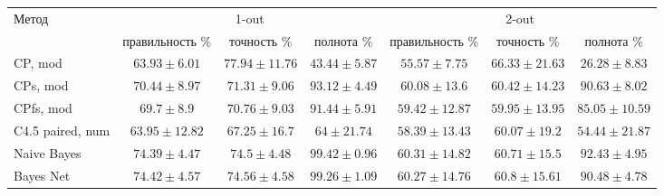 \begin{sidewaystable}[ph!]
	\centering
	\begin{tabular}{|l|ccc|ccc|}
		\hline
		\multirow{2}{*}{Метод}   & \multicolumn{3}{c|}{1-out}                             & \multicolumn{3}{c|}{2-out}         \\ \cline{2-7}  
		& правильность \%  & точность \%      & полнота \%       & правильность \%   & точность \%       & полнота \% \rule{0pt}{2.4ex} \\ \hline
		CP, mod    				 & $63.93 \pm 6.01$ & $77.94 \pm 11.76$  & $43.44 \pm 5.87$ & $55.57 \pm 7.75$  & $66.33 \pm 21.63$  & $26.28 \pm 8.83$ \rule{0pt}{2.4ex} \\ 
		CPs, mod				 & $70.44 \pm 8.97$  & $71.31 \pm 9.06$  & $93.12 \pm 4.49$ & $60.08 \pm 13.6$  & $60.42 \pm 14.23$  & $90.63 \pm 8.02$ \\
		CPfs, mod				 & $69.7 \pm 8.9$ & $70.76 \pm 9.03$ & $91.44 \pm 5.91$  & $59.42 \pm 12.87$   & $59.95 \pm 13.95$  & $85.05 \pm 10.59$ \\
		C4.5 paired, num 	     & $63.95 \pm 12.82$ & $67.25 \pm 16.7$ & $64 \pm 21.74$ & $58.39 \pm 13.43$  & $60.07 \pm 19.2$ & $54.44 \pm 21.87$ \\
		\rowcolor{lightgray} 
		Naive Bayes  			 & $74.39 \pm 4.47$  & $74.5 \pm 4.48$ & $99.42 \pm 0.96$  & $60.31 \pm 14.82$  & $60.71 \pm 15.5$   & $92.43 \pm 4.95$ \\ 
		\rowcolor{lightgray} 
		Bayes Net  				 & $74.42 \pm 4.57$  & $74.56 \pm 4.58$ & $99.26 \pm 1.09$ & $60.27 \pm  14.76$ & $60.8 \pm 15.61$ & $90.48 \pm 4.78$ \\ 
		\hline
	\end{tabular}
	\label{tbl:extra_experiments}
\end{sidewaystable}